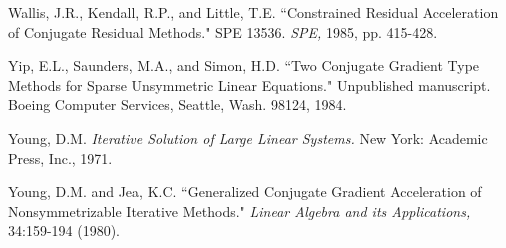 \begin{thebibliography}{99}
 Wallis, J.R., Kendall, R.P., and Little, T.E.
 ``Constrained Residual Acceleration of Conjugate Residual
 Methods."  SPE 13536. {\em SPE,} 1985, pp. 415-428.
 
 Yip, E.L., Saunders, M.A., and Simon, H.D.
 ``Two Conjugate Gradient Type Methods for Sparse Unsymmetric
 Linear Equations."  Unpublished manuscript.  Boeing Computer
 Services, Seattle, Wash.  98124, 1984.

 Young, D.M. {\em Iterative Solution of Large Linear
 Systems.}  New York: Academic Press, Inc., 1971.
 
 Young, D.M. and Jea, K.C. ``Generalized Conjugate
 Gradient Acceleration of Nonsymmetrizable Iterative Methods."
 {\em Linear Algebra and its Applications,} 34:159-194 (1980).
 
\end{thebibliography}
 

